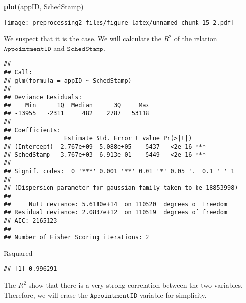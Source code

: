 \documentclass[]{article}
\newenvironment{Shaded}{\begin{snugshade}}{\end{snugshade}}
\newcommand{\KeywordTok}[1]{\textcolor[rgb]{0.13,0.29,0.53}{\textbf{#1}}}
\newcommand{\DecValTok}[1]{\textcolor[rgb]{0.00,0.00,0.81}{#1}}
\newcommand{\StringTok}[1]{\textcolor[rgb]{0.31,0.60,0.02}{#1}}
\newcommand{\OperatorTok}[1]{\textcolor[rgb]{0.81,0.36,0.00}{\textbf{#1}}}
\newcommand{\NormalTok}[1]{#1}
\begin{document}
\begin{Shaded}
\begin{Highlighting}[]
\KeywordTok{plot}\NormalTok{(appID, SchedStamp)}
\end{Highlighting}
\end{Shaded}

\texttt{[image: preprocessing2\_files/figure-latex/unnamed-chunk-15-2.pdf]}

We suspect that it is the case. We will calculate the \(R^2\) of the
relation \(\texttt{AppointmentID}\) and \(\texttt{SchedStamp}\).

\begin{Shaded}
\end{Shaded}

\begin{verbatim}
## 
## Call:
## glm(formula = appID ~ SchedStamp)
## 
## Deviance Residuals: 
##    Min      1Q  Median      3Q     Max  
## -13955   -2311     482    2787   53118  
## 
## Coefficients:
##               Estimate Std. Error t value Pr(>|t|)    
## (Intercept) -2.767e+09  5.088e+05   -5437   <2e-16 ***
## SchedStamp   3.767e+03  6.913e-01    5449   <2e-16 ***
## ---
## Signif. codes:  0 '***' 0.001 '**' 0.01 '*' 0.05 '.' 0.1 ' ' 1
## 
## (Dispersion parameter for gaussian family taken to be 18853998)
## 
##     Null deviance: 5.6180e+14  on 110520  degrees of freedom
## Residual deviance: 2.0837e+12  on 110519  degrees of freedom
## AIC: 2165123
## 
## Number of Fisher Scoring iterations: 2
\end{verbatim}

\begin{Shaded}
\begin{Highlighting}[]
\NormalTok{Rsquared}
\end{Highlighting}
\end{Shaded}

\begin{verbatim}
## [1] 0.996291
\end{verbatim}

The \(R^2\) show that there is a very strong correlation between the two
variables. Therefore, we will erase the \(\texttt{AppointmentID}\)
variable for simplicity.
\end{document}
